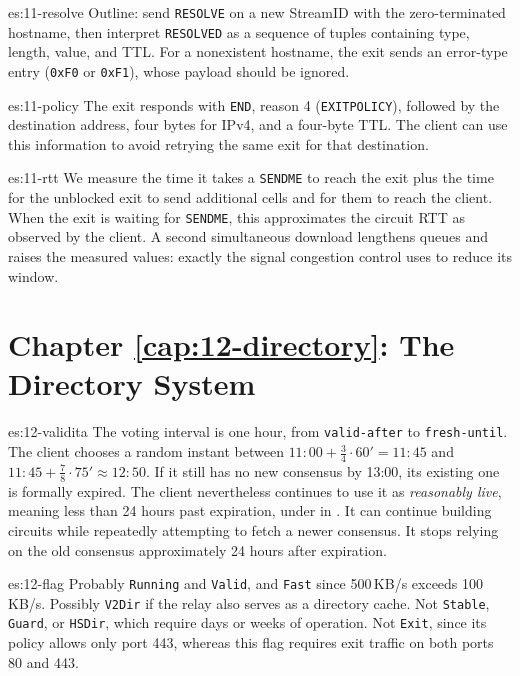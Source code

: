 \begin{soluzione}{es:11-resolve}
Outline: send \texttt{RESOLVE} on a new StreamID with the zero-terminated hostname, then interpret \texttt{RESOLVED} as a sequence of tuples containing type, length, value, and TTL. For a nonexistent hostname, the exit sends an error-type entry (\texttt{0xF0} or \texttt{0xF1}), whose payload should be ignored.
\end{soluzione}

\begin{soluzione}{es:11-policy}
The exit responds with \texttt{END}, reason 4 (\texttt{EXITPOLICY}), followed by the destination address, four bytes for IPv4, and a four-byte TTL. The client can use this information to avoid retrying the same exit for that destination.
\end{soluzione}

\begin{soluzione}{es:11-rtt}
We measure the time it takes a \texttt{SENDME} to reach the exit plus the time for the unblocked exit to send additional cells and for them to reach the client. When the exit is waiting for \texttt{SENDME}, this approximates the circuit RTT as observed by the client. A second simultaneous download lengthens queues and raises the measured values: exactly the signal congestion control uses to reduce its window.
\end{soluzione}

\section*{Chapter \ref{cap:12-directory}: The Directory System}

\begin{soluzione}{es:12-validita}
The voting interval is one hour, from \texttt{valid-after} to \texttt{fresh-until}. The client chooses a random instant between $11{:}00 + \tfrac34 \cdot 60' = 11{:}45$ and $11{:}45 + \tfrac78 \cdot 75' \approx 12{:}50$. If it still has no new consensus by 13:00, its existing one is formally expired. The client nevertheless continues to use it as \emph{reasonably live}, meaning less than 24 hours past expiration, under  in . It can continue building circuits while repeatedly attempting to fetch a newer consensus. It stops relying on the old consensus approximately 24 hours after expiration.
\end{soluzione}

\begin{soluzione}{es:12-flag}
Probably \texttt{Running} and \texttt{Valid}, and \texttt{Fast} since 500\,KB/s exceeds 100\,KB/s. Possibly \texttt{V2Dir} if the relay also serves as a directory cache. Not \texttt{Stable}, \texttt{Guard}, or \texttt{HSDir}, which require days or weeks of operation. Not \texttt{Exit}, since its policy allows only port 443, whereas this flag requires exit traffic on both ports 80 and 443.
\end{soluzione}

